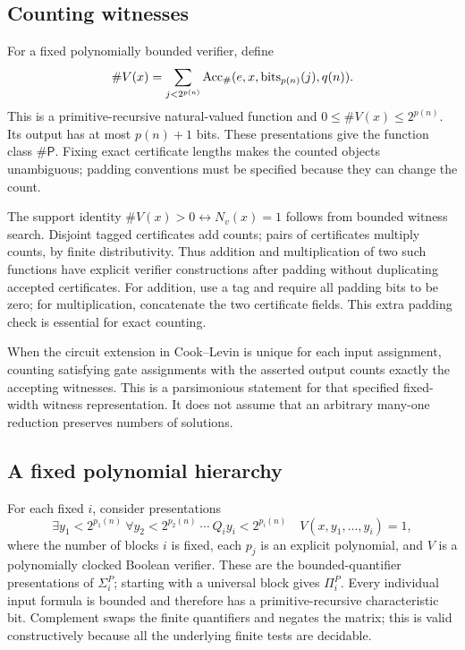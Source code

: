 \subsection{Counting witnesses}

For a fixed polynomially bounded verifier, define
\[
 \#V(x)=\sum_{j<2^{p(n)}}
       \operatorname{Acc}_{\#}(e,x,\operatorname{bits}_{p(n)}(j),q(n)).
\]
This is a primitive-recursive natural-valued function and
\(0\le\#V(x)\le2^{p(n)}\). Its output has at most \(p(n)+1\) bits.
These presentations give the function class \(\#\mathsf P\).
Fixing exact certificate lengths makes the counted objects unambiguous;
padding conventions must be specified because they can change the count.

The support identity
\(\#V(x)>0\leftrightarrow N_v(x)=1\) follows from bounded witness search.
Disjoint tagged certificates add counts; pairs of certificates multiply
counts, by finite distributivity. Thus addition and multiplication of two
such functions have explicit verifier constructions after padding without
duplicating accepted certificates. For addition, use a tag and require all
padding bits to be zero; for multiplication, concatenate the two certificate
fields. This extra padding check is essential for exact counting.

When the circuit extension in Cook--Levin is unique for each input
assignment, counting satisfying gate assignments with the asserted output
counts exactly the accepting witnesses. This is a parsimonious statement
for that specified fixed-width witness representation. It does not assume
that an arbitrary many-one reduction preserves numbers of solutions.

\subsection{A fixed polynomial hierarchy}

For each fixed \(i\), consider presentations
\[
 \exists y_1<2^{p_1(n)}\ \forall y_2<2^{p_2(n)}\ \cdots\ Q_i y_i<2^{p_i(n)}
 \quad V(x,y_1,\ldots,y_i)=1,
\]
where the number of blocks \(i\) is fixed, each \(p_j\) is an explicit
polynomial, and \(V\) is a polynomially clocked Boolean verifier. These
are the bounded-quantifier presentations of \(\Sigma_i^P\); starting with
a universal block gives \(\Pi_i^P\). Every individual input formula is
bounded and therefore has a primitive-recursive characteristic bit.
Complement swaps the finite quantifiers and negates the matrix; this is
valid constructively because all the underlying finite tests are decidable.

